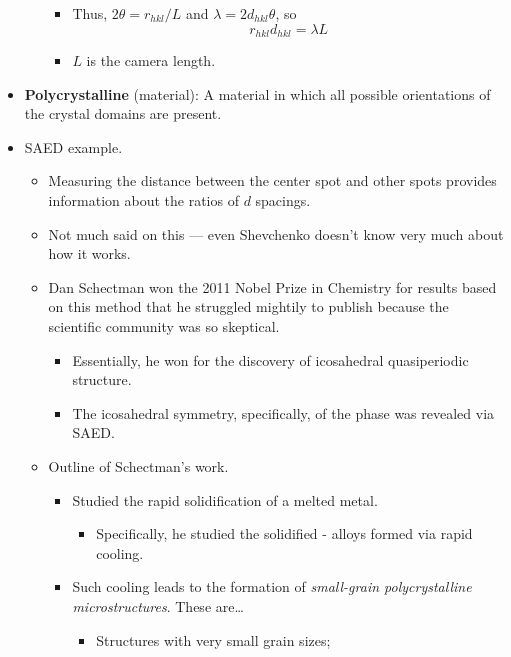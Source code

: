 \documentclass[../notes.tex]{subfiles}
\begin{document}
\begin{itemize}
\begin{itemize}
\begin{itemize}
            \item Thus, $2\theta=r_{hkl}/L$ and $\lambda=2d_{hkl}\theta$, so
            \begin{equation*}
                r_{hkl}d_{hkl} = \lambda L
            \end{equation*}
            \item $L$ is the camera length.
        \end{itemize}
    \end{itemize}
    \item \textbf{Polycrystalline} (material): A material in which all possible orientations of the crystal domains are present.
    \item SAED example.
    \begin{itemize}
        \item Measuring the distance between the center spot and other spots provides information about the ratios of $d$ spacings.
        \item Not much said on this --- even Shevchenko doesn't know very much about how it works.
        \item Dan Schectman won the 2011 Nobel Prize in Chemistry for results based on this method that he struggled mightily to publish because the scientific community was so skeptical.
        \begin{itemize}
            \item Essentially, he won for the discovery of icosahedral quasiperiodic structure.
            \item The icosahedral symmetry, specifically, of the phase was revealed via SAED.
        \end{itemize}
        \item Outline of Schectman's work.
        \begin{itemize}
            \item Studied the rapid solidification of a melted metal.
            \begin{itemize}
                \item Specifically, he studied the solidified - alloys formed via rapid cooling.
            \end{itemize}
            \item Such cooling leads to the formation of \emph{small-grain polycrystalline microstructures}. These are\dots
            \begin{itemize}
                \item Structures with very small grain sizes;

\end{itemize}
\end{itemize}
\end{itemize}
\end{itemize}
\end{document}
